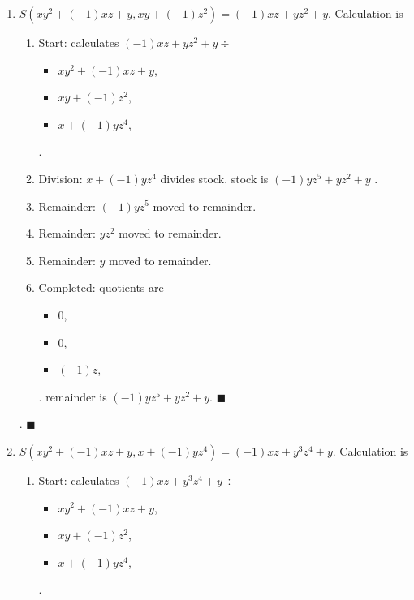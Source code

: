 \documentclass{jsarticle}
\begin{document}
\begin{enumerate}
\item $S(xy^{2}+(-1)xz+y, xy+(-1)z^{2}) = (-1)xz+yz^{2}+y$.  Calculation is \begin{enumerate}
\item Start: calculates $(-1)xz+yz^{2}+y\div $\begin{itemize}
\item $xy^{2}+(-1)xz+y$, 
\item $xy+(-1)z^{2}$, 
\item $x+(-1)yz^{4}$, 
\end{itemize} .  

\item Division: $x+(-1)yz^{4}$ divides stock. stock is $(-1)yz^{5}+yz^{2}+y$ .  
\item Remainder: $(-1)yz^{5}$ moved to remainder.  
\item Remainder: $yz^{2}$ moved to remainder.  
\item Remainder: $y$ moved to remainder.  
\item Completed: quotients are \begin{itemize}
\item $0$, 
\item $0$, 
\item $(-1)z$, 
\end{itemize} .  
remainder is $(-1)yz^{5}+yz^{2}+y$.  $\blacksquare$
\end{enumerate}
.  $\blacksquare{}$\item $S(xy^{2}+(-1)xz+y, x+(-1)yz^{4}) = (-1)xz+y^{3}z^{4}+y$.  Calculation is \begin{enumerate}
\item Start: calculates $(-1)xz+y^{3}z^{4}+y\div $\begin{itemize}
\item $xy^{2}+(-1)xz+y$, 
\item $xy+(-1)z^{2}$, 
\item $x+(-1)yz^{4}$, 
\end{itemize} .  


\end{enumerate}
\end{enumerate}
\end{document}
